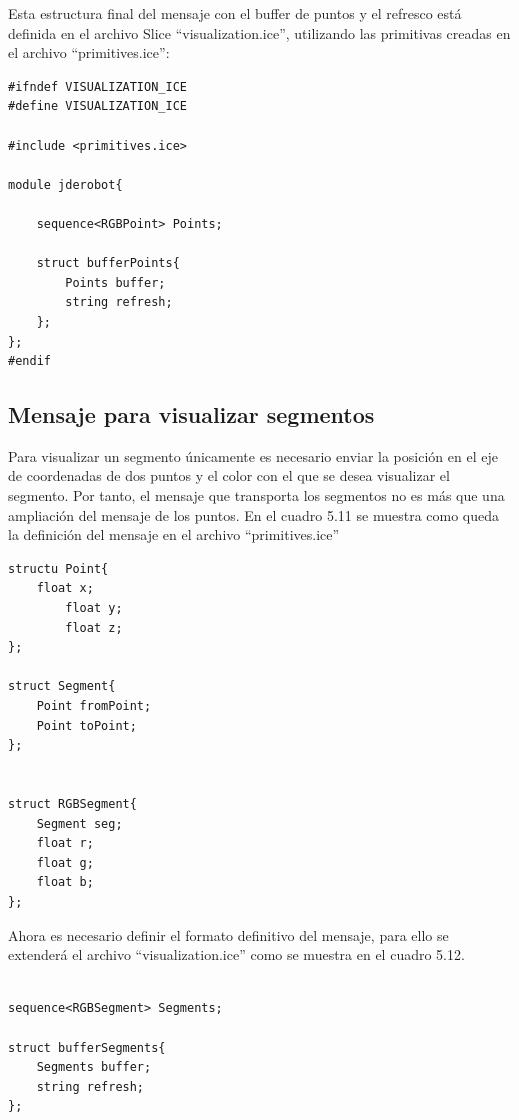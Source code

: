 Esta estructura final del mensaje con el buffer de puntos y el refresco está definida en el archivo Slice ``visualization.ice'', utilizando las primitivas creadas en el archivo ``primitives.ice'':

\begin{lstlisting}[caption= Definición del buffer de puntos con Slice, label=cod.bufferptoslice]
#ifndef VISUALIZATION_ICE
#define VISUALIZATION_ICE

#include <primitives.ice>

module jderobot{

	sequence<RGBPoint> Points;

	struct bufferPoints{
		Points buffer;
		string refresh;
	};
};
#endif
\end{lstlisting}


\subsection{Mensaje para visualizar segmentos}
Para visualizar un segmento únicamente es necesario enviar la posición en el eje de coordenadas de dos puntos y el color con el que se desea visualizar el segmento. Por tanto, el mensaje que transporta los segmentos no es más que una ampliación del mensaje de los puntos. En el cuadro 5.11 se muestra como queda la definición del mensaje en el archivo ``primitives.ice''

\begin{lstlisting}[caption= Definición de la estructura del segmento con Slice, label=cod.segmentoslice]
structu Point{
	float x;
      	float y;
      	float z;
};

struct Segment{
	Point fromPoint;
	Point toPoint;
};


struct RGBSegment{
	Segment seg;
	float r;
	float g;
	float b;
};

\end{lstlisting}

Ahora es necesario definir el formato definitivo del mensaje, para ello se extenderá el archivo ``visualization.ice'' como se muestra en el cuadro 5.12.

\begin{lstlisting}[caption= Definición del buffer de segmentos con Slice, label=cod.buffersgmslice]
	
sequence<RGBSegment> Segments;
	
struct bufferSegments{
	Segments buffer;
	string refresh;
};
\end{lstlisting}

